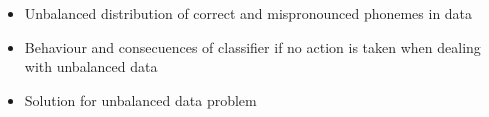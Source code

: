\begin{itemize}
	\item Unbalanced distribution of correct and mispronounced phonemes in data 
	\item Behaviour and consecuences of classifier if no action is taken when dealing with unbalanced data
	\item Solution for unbalanced data problem
\end{itemize}